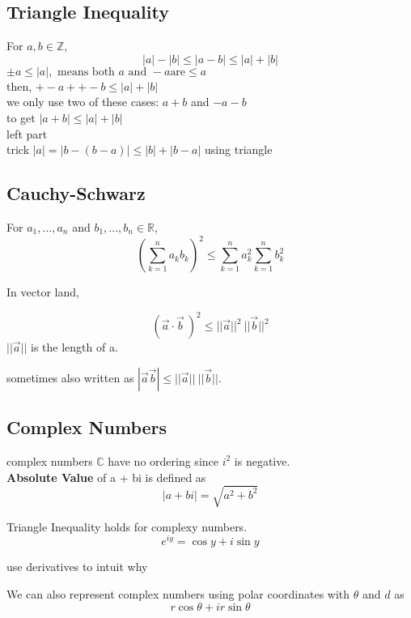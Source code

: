 \documentclass[12pt]{article}
\begin{document}
\subsection*{Triangle Inequality}

For $a, b \in \mathbb{Z}$,
$$|a| - |b| \leq |a -b| \leq |a| + |b|$$
\textcolor[gray]{0.5}{
$\pm a \leq |a|, \text{ means both } a \text{ and } -a \text{are} \leq a$\\
then, $+- a + +-b \leq |a| + |b|$\\
we only use two of these cases: $a + b$ and $-a -b$\\
to get $|a + b| \leq |a| + |b|$ \\
left part\\
trick $|a| = |b - (b - a)| \leq |b| + |b - a|$ using triangle \\
}


\subsection*{Cauchy-Schwarz}
For $a_1,..., a_n$ and $b_1, ..., b_n \in \mathbb{R}$, 
$$(\sum_{k=1}^n a_k b_k)^2 \leq \sum_{k=1}^n a_k^2 \sum_{k=1}^n b_k^2$$

In vector land, 

$$( \vec a \cdot \vec b\ )^2 \leq ||\vec a||^2\  ||\vec b||^2$$
$||\vec a||$ is the length of a.

sometimes also written as $|\vec a \vec b| \leq ||\vec a ||\ ||\vec b||$.


\subsection*{Complex Numbers}

\noindent complex numbers $\mathbb{C}$ have no ordering since $i^2$ is negative.\\

\textbf{Absolute Value} of a + bi is defined as 
$$|a + bi| = \sqrt{a^2 + b^2}$$

Triangle Inequality holds for complexy numbers.\\

$$e^{iy} = \cos y + i\sin y $$
\centerline{\textcolor[gray]{0.5}{use derivatives to intuit why}}
\medskip

We can also represent complex numbers using polar coordinates with $\theta$ and $d$ as 
$$r \cos \theta + i r \sin \theta$$
\end{document}
